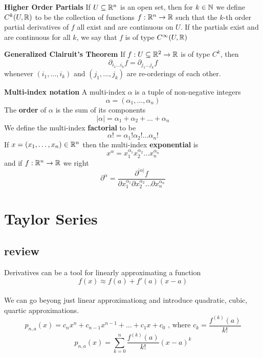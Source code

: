 \documentclass[11pt]{article}
\begin{document}
  \begin{defn}
    \label{Higher Order Partials}\textbf{Higher Order Partials} If $U\subseteq \mathbb{R}^n$ is an open set, then for $k\in\mathbb{N}$ we define $C^k(U, \mathbb{R})$ to be the collection of functions $f:\mathbb{R}^n \rightarrow \mathbb{R}$ such that the $k$-th order partial derivatives of $f$ all exist and are continuous on $U$. If the partials exist and are continuous for all $k$, we say that $f$ is of type $C^{\infty}(U, \mathbb{R})$
  \end{defn}

  \begin{theorem}
    \label{Generalized Clairuit's Theorem} \textbf{Generalized Clairuit's Theorem} If $f:U\subseteq \mathbb{R}^2 \rightarrow \mathbb{R}$ is of type $C^k$, then
    \[
      \partial_{i_1 \dots i_k} f = \partial_{j_1\dots j_k} f
    \]
    whenever $(i_1, \dots, i_k)$ and $(j_1, \dots, j_k)$ are re-orderings of each other.
  \end{theorem}


  \begin{defn}
    \label{Multi-indices}\textbf{Multi-index notation}
    A multi-index $\alpha$ is a tuple of non-negative integers
    \[
      \alpha = (\alpha_1, \dots, \alpha_n)
    \]
    The \textbf{order}  of $\alpha$ is the sum of its components
    \[
      | \alpha | = \alpha_1 + \alpha_2 + \dots + \alpha_n
    \]
    We define the multi-index \textbf{factorial} to be
    \[
      \alpha ! = \alpha_1 ! \alpha_2 ! \dots \alpha_n !
    \]
    If $x = (x_1, \dots, x_n)\in\mathbb{R}^n$ then the multi-index \textbf{exponential} is
    \[
      x^{\alpha} = x_1^{\alpha_1} x_2^{\alpha_2} \dots x_n^{\alpha_n}
    \]
    and if $f:\mathbb{R}^n \rightarrow \mathbb{R}$ we right
    \[
      \partial^{\alpha} = \frac{\partial^{| \alpha |} f}{\partial x_1^{\alpha_1} \partial x_2^{\alpha_2} \dots \partial x_n^{\alpha_n}}
    \]
  \end{defn}

  \section{Taylor Series}

  \subsection{review}

  Derivatives can be a tool for linearly approximating a function
  \[
    f(x) \approx f(a) + f'(a)(x-a)
  \]
  \\We can go beyong just linear approximationg and introduce quadratic, cubic, quartic approximations.
  \[
    p_{n,a} (x) = c_n x^n + c_{n-1} x^{n-1} + \dots + c_1 x + c_0 \text{ , where } c_k = \frac{f^{(k)}(a)}{k!}
  \]
  \[
    p_{n,a}(x) = \sum_{k=0}^{n} \frac{f^{(k)}(a)}{k!} (x-a)^k
  \]
\end{document}
